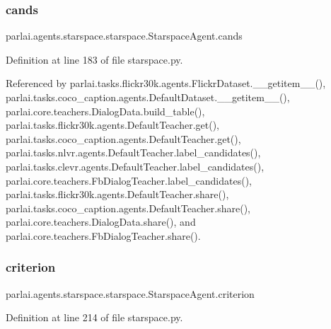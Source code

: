 \subsubsection{\texorpdfstring{cands}{cands}}
{\footnotesize\ttfamily parlai.\+agents.\+starspace.\+starspace.\+Starspace\+Agent.\+cands}



Definition at line 183 of file starspace.\+py.



Referenced by parlai.\+tasks.\+flickr30k.\+agents.\+Flickr\+Dataset.\+\_\+\+\_\+getitem\+\_\+\+\_\+(), parlai.\+tasks.\+coco\+\_\+caption.\+agents.\+Default\+Dataset.\+\_\+\+\_\+getitem\+\_\+\+\_\+(), parlai.\+core.\+teachers.\+Dialog\+Data.\+build\+\_\+table(), parlai.\+tasks.\+flickr30k.\+agents.\+Default\+Teacher.\+get(), parlai.\+tasks.\+coco\+\_\+caption.\+agents.\+Default\+Teacher.\+get(), parlai.\+tasks.\+nlvr.\+agents.\+Default\+Teacher.\+label\+\_\+candidates(), parlai.\+tasks.\+clevr.\+agents.\+Default\+Teacher.\+label\+\_\+candidates(), parlai.\+core.\+teachers.\+Fb\+Dialog\+Teacher.\+label\+\_\+candidates(), parlai.\+tasks.\+flickr30k.\+agents.\+Default\+Teacher.\+share(), parlai.\+tasks.\+coco\+\_\+caption.\+agents.\+Default\+Teacher.\+share(), parlai.\+core.\+teachers.\+Dialog\+Data.\+share(), and parlai.\+core.\+teachers.\+Fb\+Dialog\+Teacher.\+share().

\mbox{\label{classparlai_1_1agents_1_1starspace_1_1starspace_1_1StarspaceAgent_a384ddfe5e4ad6c08243e6b8b1136ecbc}} 
\subsubsection{\texorpdfstring{criterion}{criterion}}
{\footnotesize\ttfamily parlai.\+agents.\+starspace.\+starspace.\+Starspace\+Agent.\+criterion}



Definition at line 214 of file starspace.\+py.




